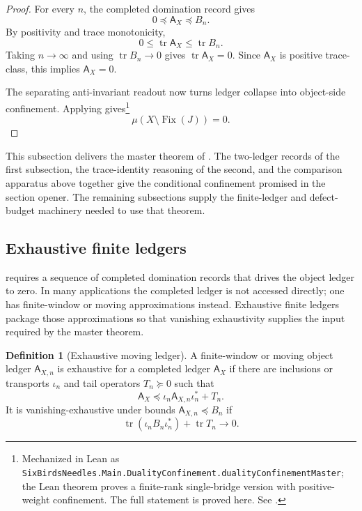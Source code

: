 \documentclass[11pt]{article}
\DeclareMathOperator{\tr}{tr}
\newcommand{\Fix}{\operatorname{Fix}}
\newcommand{\preceqq}{\preceq}
\theoremstyle{definition}
\newtheorem{definition}[theorem]{Definition}
\begin{document}
\begin{proof}
For every \(n\), the completed domination record gives
\[
  0\preceqq \mathsf A_X\preceqq B_n.
\]
By positivity and trace monotonicity,
\[
  0\le \tr\mathsf A_X\le \tr B_n.
\]
Taking \(n\to\infty\) and using \(\tr B_n\to 0\) gives
\(\tr\mathsf A_X=0\).  Since \(\mathsf A_X\) is positive trace-class,
this implies \(\mathsf A_X=0\).

The separating anti-invariant readout now turns ledger collapse into
object-side confinement.  Applying
 gives\footnote{Mechanized in Lean as
\texttt{SixBirdsNeedles.Main.DualityConfinement.dualityConfinementMaster};
the Lean theorem proves a finite-rank single-bridge version with
positive-weight confinement.  The full statement is proved here.  See
.}
\[
  \mu(X\setminus\Fix(J))=0.
\]
\end{proof}

This subsection delivers the master theorem of
.  The two-ledger records of the first
subsection, the trace-identity reasoning of the second, and the
comparison apparatus above together give the conditional confinement
promised in the section opener.  The remaining subsections supply the
finite-ledger and defect-budget machinery needed to use that theorem.

\subsection{Exhaustive finite ledgers}

 requires a sequence of
completed domination records that drives the object ledger to zero.  In
many applications the completed ledger is not accessed directly; one
has finite-window or moving approximations instead.  Exhaustive finite
ledgers package those approximations so that vanishing exhaustivity
supplies the input required by the master theorem.

\begin{definition}[Exhaustive moving ledger]\label{def:main:exhaustive-moving-ledger}
A finite-window or moving object ledger \(\mathsf A_{X,n}\) is
exhaustive for a completed ledger \(\mathsf A_X\) if there are
inclusions or transports \(\iota_n\) and tail operators
\(T_n\succeq 0\) such that
\[
  \mathsf A_X\preceqq \iota_n\mathsf A_{X,n}\iota_n^*+T_n.
\]
It is vanishing-exhaustive under bounds
\(\mathsf A_{X,n}\preceqq B_n\) if
\[
  \tr(\iota_nB_n\iota_n^*)+\tr T_n\to 0.
\]
\end{definition}
\end{document}
